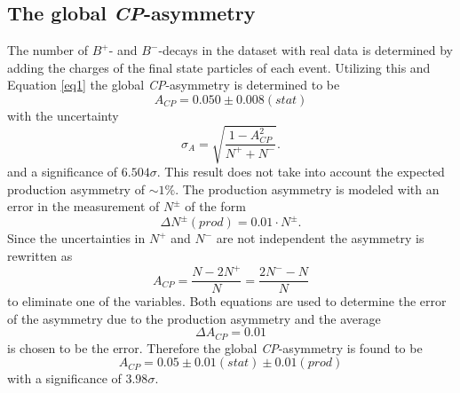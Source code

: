 \subsection{The global \textit{CP}-asymmetry}
The number of $B^+$- and $B^-$-decays in the dataset with real data is determined by adding the charges of the final state
particles of each event. Utilizing this and Equation \eqref{eq1} the global \textit{CP}-asymmetry is determined to be
\begin{equation}
  A_\textit{CP} = 0.050 \pm 0.008 (stat)
\end{equation}
with the uncertainty
\begin{equation}
  \sigma_A = \sqrt{\frac{1-A_\textit{CP}^2}{N^+ + N^-}}.
\end{equation}
and a significance of $6.504 \sigma$. This result does not take into account the expected production asymmetry of $\sim 1\%$.
The production asymmetry is modeled with an error in the measurement of $N^\pm$ of the form
\begin{equation}
  \Delta N^\pm (prod) = 0.01 \cdot N^\pm .
\end{equation}
Since the uncertainties in $N^+$ and $N^-$ are not independent the asymmetry is rewritten as
\begin{equation}
  A_\textit{CP} = \frac{N- 2 N^+}{N} = \frac{2 N^- - N}{N}
\end{equation}
to eliminate one of the variables. Both equations are used to determine the error of the asymmetry due to the production
asymmetry and the average
\begin{equation}
  \Delta A_\textit{CP} = 0.01
\end{equation}
is chosen to be the error.
Therefore the global \textit{CP}-asymmetry is found to be
\begin{equation}
  A_\textit{CP} = 0.05 \pm 0.01 (stat) \pm 0.01 (prod)
\end{equation}
with a significance of $3.98\sigma$.




